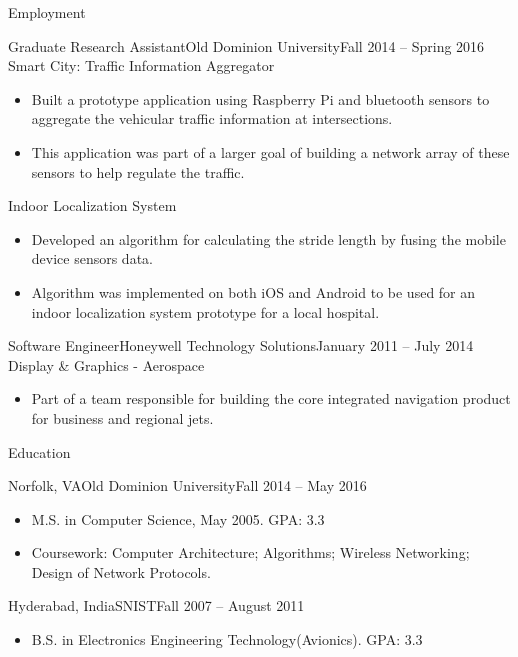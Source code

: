 \documentclass{mcdowellcv}
\begin{document}
\begin{cvsection}{Employment}
		\begin{cvsubsection}{Graduate Research Assistant}{Old Dominion University}{Fall 2014 -- Spring 2016}
			Smart City: Traffic Information Aggregator
			\begin{itemize}
				\item Built a prototype application using Raspberry Pi and bluetooth sensors to aggregate the vehicular traffic information at intersections.
				\item This application was part of a larger goal of building a network array of these sensors to help regulate the traffic.
			\end{itemize}
			Indoor Localization System
			\begin{itemize}
				\item Developed an algorithm for calculating the stride length by fusing the mobile device sensors data.
				\item Algorithm was implemented on both iOS and Android to be used for an indoor localization system prototype for a local hospital.
			\end{itemize}
		\end{cvsubsection}
		
		\begin{cvsubsection}{Software Engineer}{Honeywell Technology Solutions}{January 2011 -- July 2014}
			Display \& Graphics - Aerospace
			\begin{itemize}
				\item Part of a team responsible for building the core integrated navigation product for business and regional jets.
			\end{itemize}
		\end{cvsubsection}
	\end{cvsection}
	
	\begin{cvsection}{Education}
		\begin{cvsubsection}{Norfolk, VA}{Old Dominion University}{Fall 2014 -- May 2016}
			\begin{itemize}
				\item M.S. in Computer Science, May 2005. GPA: 3.3
				\item Coursework: Computer Architecture; Algorithms; Wireless Networking; Design of Network Protocols.
			\end{itemize}
		\end{cvsubsection}
		\begin{cvsubsection}{Hyderabad, India}{SNIST}{Fall 2007 -- August 2011}
			\begin{itemize}
				\item B.S. in Electronics Engineering Technology(Avionics). GPA: 3.3
			\end{itemize}
		\end{cvsubsection}
	\end{cvsection}
	
\end{document}
